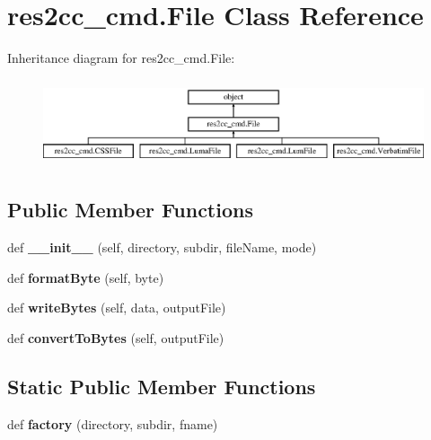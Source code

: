 \hypertarget{classres2cc__cmd_1_1_file}{}\section{res2cc\+\_\+cmd.\+File Class Reference}
\label{classres2cc__cmd_1_1_file}
Inheritance diagram for res2cc\+\_\+cmd.\+File\+:\begin{figure}[H]
\begin{center}
\leavevmode
\includegraphics[height=2.560976cm]{classres2cc__cmd_1_1_file}
\end{center}
\end{figure}
\subsection*{Public Member Functions}
\begin{DoxyCompactItemize}
\item 
\mbox{\label{classres2cc__cmd_1_1_file_a8cd6fc2e494abb7fffdcade5e795e604}} 
def {\bfseries \+\_\+\+\_\+init\+\_\+\+\_\+} (self, directory, subdir, file\+Name, mode)
\item 
\mbox{\label{classres2cc__cmd_1_1_file_ac0b99df4d5caba3311d18ae7b08dfd64}} 
def {\bfseries format\+Byte} (self, byte)
\item 
\mbox{\label{classres2cc__cmd_1_1_file_adaa5b0dc35c50cec7cf1c816dda8694a}} 
def {\bfseries write\+Bytes} (self, data, output\+File)
\item 
\mbox{\label{classres2cc__cmd_1_1_file_a9f6432a73ece44e2ce3b50c033971b26}} 
def {\bfseries convert\+To\+Bytes} (self, output\+File)
\end{DoxyCompactItemize}
\subsection*{Static Public Member Functions}
\begin{DoxyCompactItemize}
\item 
\mbox{\label{classres2cc__cmd_1_1_file_abfd845a0deb0b3499595c852121930f7}} 
def {\bfseries factory} (directory, subdir, fname)
\end{DoxyCompactItemize}

